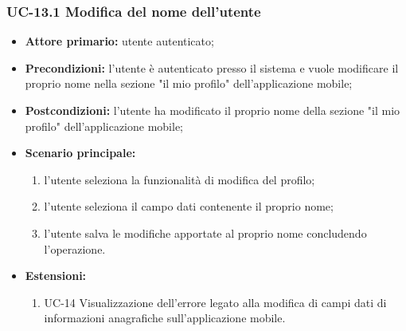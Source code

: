 \subsubsection{UC-13.1 Modifica del nome dell'utente}

\begin{itemize}

	\item \textbf{Attore primario:} utente autenticato;

	\item \textbf{Precondizioni:} l'utente è autenticato presso il sistema e vuole modificare il proprio nome nella sezione "il mio profilo" dell'applicazione mobile;

	\item \textbf{Postcondizioni:} l'utente ha modificato il proprio nome della sezione "il mio profilo" dell'applicazione mobile;

	\item \textbf{Scenario principale:}
	
		\begin{enumerate}
   		 	\item l'utente seleziona la funzionalità di modifica del profilo;
   		 	\item l'utente seleziona il campo dati contenente il proprio nome;
   		 	\item l'utente salva le modifiche apportate al proprio nome concludendo l'operazione.
		\end{enumerate}
		
	\item \textbf{Estensioni:}
		\begin{enumerate}
    		\item UC-14 Visualizzazione dell'errore legato alla modifica di campi dati di informazioni anagrafiche sull'applicazione mobile.
		\end{enumerate}
		
\end{itemize}


